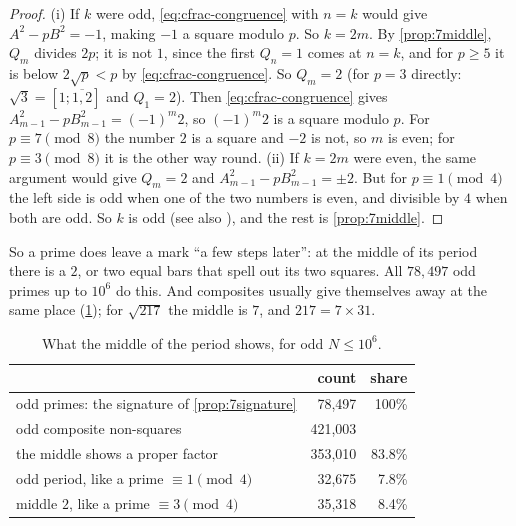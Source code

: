 \begin{proof}
(i) If $k$ were odd, \eqref{eq:cfrac-congruence} with $n=k$ would give $A^{2}-pB^{2}=-1$, making $-1$ a square modulo $p$. So
$k=2m$. By \cref{prop:7middle}, $Q_m$ divides $2p$; it is not $1$, since the first $Q_n=1$
comes at $n=k$, and for $p\ge5$ it is below $2\sqrt p<p$ by \eqref{eq:cfrac-congruence}. So $Q_m=2$ (for $p=3$ directly:
$\sqrt3=[1;\overline{1,2}]$ and $Q_1=2$). Then \eqref{eq:cfrac-congruence} gives
$A_{m-1}^{2}-pB_{m-1}^{2}=(-1)^{m}2$, so $(-1)^{m}2$ is a square modulo $p$. For $p\equiv7\pmod8$ the
number $2$ is a square and $-2$ is not, so $m$ is even; for $p\equiv3\pmod8$ it is the other way round.
(ii) If $k=2m$ were even, the same argument would give $Q_m=2$ and $A_{m-1}^{2}-pB_{m-1}^{2}=\pm2$. But
for $p\equiv1\pmod4$ the left side is odd when one of the two numbers is even, and divisible by $4$
when both are odd. So $k$ is odd (see also \citep{OEIS_A054269}), and the rest is
\cref{prop:7middle}.
\end{proof}

So a prime does leave a mark ``a few steps later'': at the middle of its period there is a $2$, or two
equal bars that spell out its two squares. All $78{,}497$ odd primes up to $10^{6}$ do this. And
composites usually give themselves away at the same place (\cref{tab:7signature}); for
$\sqrt{217}$ the middle is $7$, and $217=7\times31$.

\begin{table}[t]
\centering
\caption[What the middle of the period shows]{What the middle of the period shows, for odd $N\le10^{6}$.}\label{tab:7signature}
\small
\begin{tabular}{lrr}
\toprule
 & count & share\\
\midrule
odd primes: the signature of \cref{prop:7signature} & 78{,}497 & 100\%\\
odd composite non-squares & 421{,}003 & \\
\quad the middle shows a proper factor & 353{,}010 & 83.8\%\\
\quad odd period, like a prime $\equiv1\pmod4$ & 32{,}675 & 7.8\%\\
\quad middle $2$, like a prime $\equiv3\pmod4$ & 35{,}318 & 8.4\%\\
\bottomrule
\end{tabular}
\end{table}

